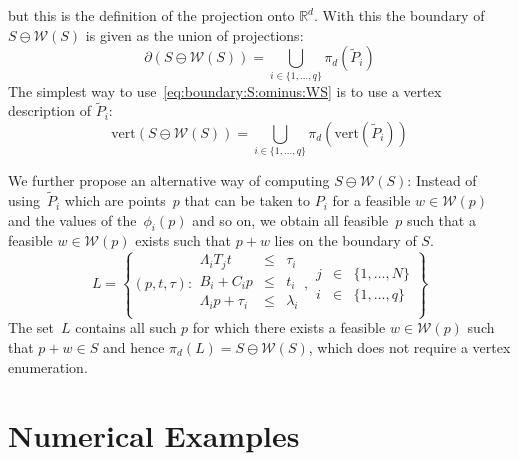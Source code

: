 \documentclass{elsarticle}
\theoremstyle{remark}
\theoremstyle{definition}
\begin{document}
%
but this is the definition of the projection onto $\mathbb R^d$.
%
With this the boundary of $S\ominus \mathcal W(S)$ is given as the union of projections:
%
\begin{equation}\label{eq:boundary:S:ominus:WS}
 \partial(S\ominus\mathcal W(S)) = \bigcup_{i\in\{1,\dots,q\}}\pi_d\left(
\tilde P_i
 \right)
\end{equation}
%
The simplest way to use~\eqref{eq:boundary:S:ominus:WS} is to use a vertex description of $\tilde P_i$:
%
\begin{equation}\label{the:way:we:compute:p:pontryagin:differences}
  \text{vert}(S\ominus\mathcal W(S)) = \bigcup_{i\in\{1,\dots,q\}}\pi_d(\text{vert}(\tilde P_i))
\end{equation}

We further propose an alternative way of computing $S\ominus\mathcal W(S)$:
%
Instead of using~$\tilde P_i$ which are points~$p$ that can be taken to $P_i$ for a feasible $w\in\mathcal W(p)$ and the values of the~$\phi_i(p)$ and so on, we obtain all feasible~$p$ such that a feasible $w\in\mathcal W(p)$ exists such that $p+w$ lies on the boundary of $S$.
%
\begin{equation}
  L = \left\{(p,t,\tau):\begin{array}{rcl}
  \Lambda_iT_jt&\leq&\tau_i\\
  B_i+C_i p&\leq& t_i\\
  \Lambda_i p + \tau_i&\leq&\lambda_i\\
  \end{array},\begin{array}{rcl}
  j&\in&\{1,\dots,N\}\\
  i&\in&\{1,\dots,q\}\end{array}
  \right\}
\end{equation}
%
The set~$L$ contains all such $p$ for which there exists a feasible $w\in\mathcal W(p)$ such that $p+w\in S$ and hence $\pi_d(L)=S\ominus\mathcal W(S)$, which does not require a vertex enumeration.
%
%
%
%
%
\section{Numerical Examples}\label{sec:numerical:examples}
\end{document}
